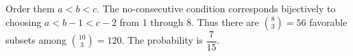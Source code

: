 Order them $ a<b<c $. The no-consecutive condition corresponds bijectively to choosing $ a<b-1<c-2 $ from 1 through 8. Thus there are $\binom83=56 $ favorable subsets among $\binom{10}{3}=120 $. The probability is $\boxed{\dfrac{7}{15}}$.
